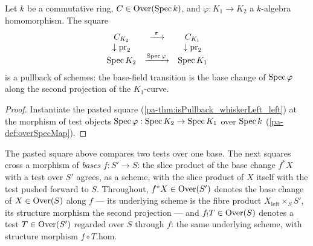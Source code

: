 \begin{theorem}
  \label{pa-thm:isPullback_baseFieldTransition}
  \leanok

  Let \(k\) be a commutative ring, \(C \in \mathrm{Over}(\operatorname{Spec} k)\), and
  \(\varphi : K_1 \to K_2\) a \(k\)-algebra homomorphism. The square
  \[
    \begin{array}{ccc}
      C_{K_2} & \xrightarrow{\ \pi\ } & C_{K_1} \\
      \downarrow \mathrm{pr}_2 & & \downarrow \mathrm{pr}_2 \\
      \operatorname{Spec} K_2 & \xrightarrow{\operatorname{Spec} \varphi} & \operatorname{Spec} K_1
    \end{array}
  \]
  is a pullback of schemes: the base-field transition is the base change of
  \(\operatorname{Spec}\varphi\) along the second projection of the \(K_1\)-curve.
\end{theorem}
\begin{proof}
  \leanok
  Instantiate the pasted square (\ref{pa-thm:isPullback_whiskerLeft_left}) at the morphism
  of test objects \(\operatorname{Spec}\varphi : \operatorname{Spec} K_2 \to \operatorname{Spec} K_1\) over \(\operatorname{Spec} k\)
  (\ref{pa-def:overSpecMap}).
\end{proof}

The pasted square above compares two tests over one base. The next squares cross a
morphism of \emph{bases} \(f : S' \to S\): the slice product of the base change
\(f^{*}X\) with a test over \(S'\) agrees, as a scheme, with the slice product of \(X\)
itself with the test pushed forward to \(S\). Throughout, \(f^{*}X \in \mathrm{Over}(S')\)
denotes the base change of \(X \in \mathrm{Over}(S)\) along \(f\) --- its underlying scheme is
the fibre product \(X_{\mathrm{left}} \times_S S'\), its structure morphism the second
projection --- and \(f_{!}T \in \mathrm{Over}(S)\) denotes a test \(T \in \mathrm{Over}(S')\) regarded
over \(S\) through \(f\): the same underlying scheme, with structure morphism
\(f \circ T.\mathrm{hom}\).


